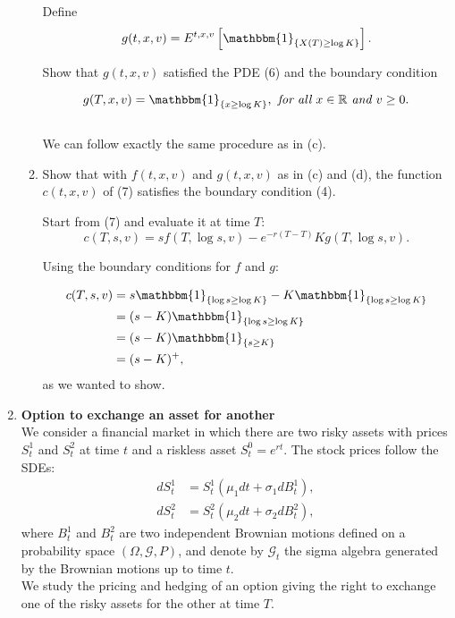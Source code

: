 \documentclass[handout,8pt]{beamer}
\begin{document}
\begin{frame}[allowframebreaks]{ }
\begin{enumerate}
\begin{enumerate}
        Define
        \begin{equation*}
            g(t,x,v) = E^{t,x,v}\left[\mathbbm{1}_{\{X(T)\geq\log K\}}\right].
        \end{equation*}
        
        Show that $g(t,x,v)$ satisfied the PDE (6) and the boundary condition
        
        \begin{equation*}
            g(T,x,v) = \mathbbm{1}_{\{x\geq \log K\}}, \textit{ for all } x\in\mathbb{R} \textit{ and } v\geq 0.
        \end{equation*}\\
        
        We can follow exactly the same procedure as in (c).
        
        \item Show that with $f(t,x,v)$ and $g(t,x,v)$ as in (c) and (d), the function $c(t,x,v)$ of (7) satisfies the boundary condition (4).\newline
        
        Start from (7) and evaluate it at time $T$:
        \begin{equation*}
            c(T,s,v) = sf(T,\log s,v) - e^{-r(T-T)}Kg(T,\log s,v).
        \end{equation*}
        
        Using the boundary conditions for $f$ and $g$:
        
        \begin{align*}
            c(T,s,v) &= s\mathbbm{1}_{\{\log s\geq\log K\}} - K\mathbbm{1}_{\{\log s\geq\log K\}}\\
            &= (s-K)\mathbbm{1}_{\{\log s\geq \log K\}}\\
            &= (s-K)\mathbbm{1}_{\{s\geq K\}}\\
            &= (s-K)^+,
        \end{align*}
        as we wanted to show.
    \end{enumerate}
    
    \newpage
    
    \item \textbf{Option to exchange an asset for another}\\
    We consider a financial market in which there are two risky assets with prices $S_t^1$ and $S_t^2$ at time $t$ and a riskless asset $S_t^0=e^{rt}$. The stock prices follow the SDEs:
    \begin{align*}
        dS_t^1 &= S_t^1(\mu_1 dt + \sigma_1 dB_t^1),\\
        dS_t^2 &= S_t^2(\mu_2 dt + \sigma_2 dB_t^2),
    \end{align*}
    where $B_t^1$ and $B_t^2$ are two independent Brownian motions defined on a probability space $(\Omega,\mathcal{G},P)$, and denote by $\mathcal{G}_t$ the sigma algebra generated by the Brownian motions up to time $t$.\\
    We study the pricing and hedging of an option giving the right to exchange one of the risky assets for the other at time $T$.
    

\end{enumerate}
\end{frame}
\end{document}
